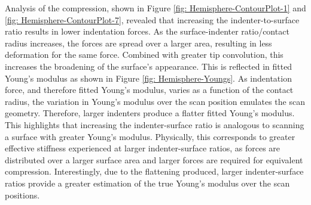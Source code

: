 Analysis of the compression, shown in Figure \ref{fig: Hemisphere-ContourPlot-1} and \ref{fig: Hemisphere-ContourPlot-7}, revealed that increasing the indenter-to-surface ratio results in lower indentation forces. As the surface-indenter ratio/contact radius increases, the forces are spread over a larger area, resulting in less deformation for the same force. Combined with greater tip convolution, this increases the broadening of the surface's appearance. This is reflected in fitted Young's modulus as shown in Figure \ref{fig: Hemisphere-Youngs}. As indentation force, and therefore fitted Young's modulus, varies as a function of the contact radius, the variation in Young's modulus over the scan position emulates the scan geometry. Therefore, larger indenters produce a flatter fitted Young's modulus. This highlights that increasing the indenter-surface ratio is analogous to scanning a surface with greater Young's modulus. Physically, this corresponds to greater effective stiffness experienced at larger indenter-surface ratios, as forces are distributed over a larger surface area and larger forces are required for equivalent compression. Interestingly, due to the flattening produced, larger indenter-surface ratios provide a greater estimation of the true Young's modulus over the scan positions.


